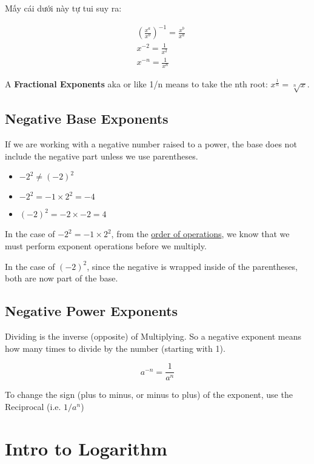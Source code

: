 Mấy cái dưới này tự tui suy ra:

\[
  \begin{aligned}
    &\left( \frac{x^{a}}{x^{b}} \right)^{-1} = \frac{x^{b}}{x^{a}}\\
    &x^{-2}=\frac{1}{x^{2}}\\
    &x^{-n}=\frac{1}{x^{n}}
  \end{aligned}
\]

A \textbf{Fractional Exponents} aka  or  like 1/n means to take the nth root: \(x^{\frac{1}{n}}=\sqrt[n]{x}\).

\subsection{Negative Base Exponents}

If we are working with a negative number raised to a power, the base does not include the negative part unless we use parentheses.

\begin{itemize}
  \item \(-2^{2} \neq (-2)^{2}\)
  \item \(-2^{2}=-1 \times 2^{2}=-4\)
  \item \((-2)^{2} = -2 \times -2 = 4\)
\end{itemize}

In the case of \(-2^{2} = -1 \times 2^{2}\), from the \href{https://greenemath.com/Prealgebra/16/OrderofOperationsLesson.html}{order of operations}, we know that we must perform exponent operations before we multiply.

In the case of \((-2)^{2}\), since the negative is wrapped inside of the parentheses, both are now part of the base.

\subsection{Negative Power Exponents}

Dividing is the inverse (opposite) of Multiplying. So a negative exponent means how many times to divide by the number (starting with 1).

\[a^{-n} = \frac{1}{a^{n}}\]

To change the sign (plus to minus, or minus to plus) of the exponent, use the Reciprocal (i.e. \(1/a^{n}\))

\section{Intro to Logarithm}

